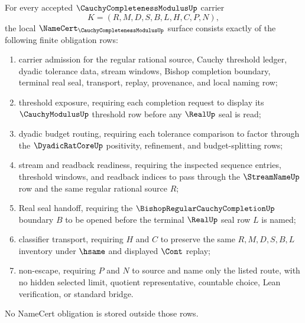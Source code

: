 \begin{theorem}
\label{thm:cauchy-completeness-modulus-namecert-obligations}
For every accepted $\CauchyCompletenessModulusUp$ carrier
$$
K=(R,M,D,S,B,L,H,C,P,N),
$$
the local $\NameCert_{\CauchyCompletenessModulusUp}$ surface consists exactly of the following finite obligation rows:
\begin{enumerate}
\item carrier admission for the regular rational source, Cauchy threshold ledger, dyadic tolerance data, stream windows, Bishop completion boundary, terminal real seal, transport, replay, provenance, and local naming row;
\item threshold exposure, requiring each completion request to display its $\CauchyModulusUp$ threshold row before any $\RealUp$ seal is read;
\item dyadic budget routing, requiring each tolerance comparison to factor through the $\DyadicRatCoreUp$ positivity, refinement, and budget-splitting rows;
\item stream and readback readiness, requiring the inspected sequence entries, threshold windows, and readback indices to pass through the $\StreamNameUp$ row and the same regular rational source $R$;
\item Real seal handoff, requiring the $\BishopRegularCauchyCompletionUp$ boundary $B$ to be opened before the terminal $\RealUp$ seal row $L$ is named;
\item classifier transport, requiring $H$ and $C$ to preserve the same $R,M,D,S,B,L$ inventory under $\hsame$ and displayed $\Cont$ replay;
\item non-escape, requiring $P$ and $N$ to source and name only the listed route, with no hidden selected limit, quotient representative, countable choice, Lean verification, or standard bridge.
\end{enumerate}
No NameCert obligation is stored outside those rows.
\end{theorem}
